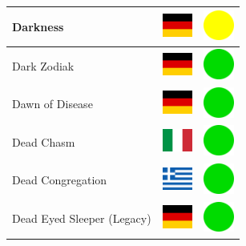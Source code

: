 \documentclass[12pt, a4paper, twoside]{report}
\begin{document}
\begin{center}
\begin{longtable}{|p{5cm}|p{2cm}|p{2cm}|}
 Darkness                                                   & \includegraphics[width=1cm]{../4x3/de} &   \includegraphics[width=1cm]{../likes/m} \\ \hline
 Dark Zodiak                                                & \includegraphics[width=1cm]{../4x3/de} &   \includegraphics[width=1cm]{../likes/y} \\ \hline
 Dawn of Disease                                            & \includegraphics[width=1cm]{../4x3/de} &   \includegraphics[width=1cm]{../likes/y} \\ \hline
 Dead Chasm                                                 & \includegraphics[width=1cm]{../4x3/it} &   \includegraphics[width=1cm]{../likes/y} \\ \hline
 Dead Congregation                                          & \includegraphics[width=1cm]{../4x3/gr} &   \includegraphics[width=1cm]{../likes/y} \\ \hline
 Dead Eyed Sleeper (Legacy)                                 & \includegraphics[width=1cm]{../4x3/de} &   \includegraphics[width=1cm]{../likes/y} \\ \hline

\end{longtable}
\end{center}
\end{document}
